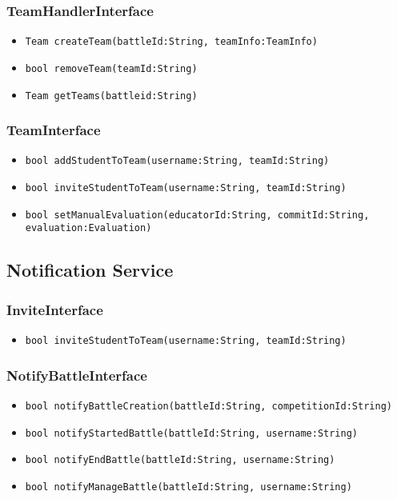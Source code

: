 \subsubsection{TeamHandlerInterface}
\begin{itemize}
    \item \texttt{Team createTeam(battleId:String, teamInfo:TeamInfo)}
    \item \texttt{bool removeTeam(teamId:String)}
    \item \texttt{Team getTeams(battleid:String)}%
\end{itemize}

\subsubsection{TeamInterface}
\begin{itemize}
    \item \texttt{bool addStudentToTeam(username:String, teamId:String)}%
    \item \texttt{bool inviteStudentToTeam(username:String, teamId:String)}%
    \item \texttt{bool setManualEvaluation(educatorId:String, commitId:String,\\evaluation:Evaluation)}%
\end{itemize}


\subsection{Notification Service}
\subsubsection{InviteInterface}
\begin{itemize}
    \item \texttt{bool inviteStudentToTeam(username:String, teamId:String)}%
\end{itemize}

\subsubsection{NotifyBattleInterface}
\begin{itemize}
    \item \texttt{bool notifyBattleCreation(battleId:String, competitionId:String)}%
    \item \texttt{bool notifyStartedBattle(battleId:String, username:String)}
    \item \texttt{bool notifyEndBattle(battleId:String, username:String)}
    \item \texttt{bool notifyManageBattle(battleId:String, username:String)}
\end{itemize}


